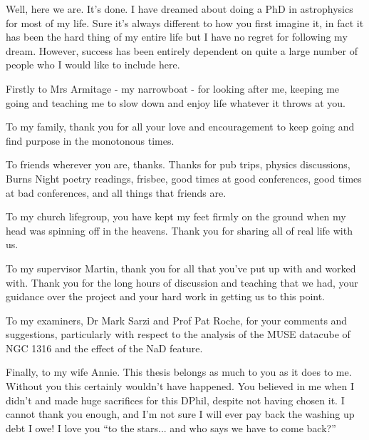 \begin{acknowledgementslong}
Well, here we are. It's done. I have dreamed about doing a PhD in astrophysics for most of my life. Sure it's always different to how you first imagine it, in fact it has been the hard thing of my entire life but I have no regret for following my dream. However, success has been entirely dependent on quite a large number of people who I would like to include here. 

Firstly to Mrs Armitage - my narrowboat - for looking after me, keeping me going and teaching me to slow down and enjoy life whatever it throws at you. 

To my family, thank you for all your love and encouragement to keep going and find purpose in the monotonous times. 

To friends wherever you are, thanks. Thanks for pub trips, physics discussions, Burns Night poetry readings, frisbee, good times at good conferences, good times at bad conferences, and all things that friends are.

To my church lifegroup, you have kept my feet firmly on the ground when my head was spinning off in the heavens. Thank you for sharing all of real life with us. 

To my supervisor Martin, thank you for all that you've put up with and worked with. Thank you for the long hours of discussion and teaching that we had, your guidance over the project and your hard work in getting us to this point. 

To my examiners, Dr Mark Sarzi and Prof Pat Roche, for your comments and suggestions, particularly with respect to the analysis of the MUSE datacube of NGC 1316 and the effect of the NaD feature. 

Finally, to my wife Annie. This thesis belongs as much to you as it does to me. Without you this certainly wouldn't have happened. You believed in me when I didn't and made huge sacrifices for this DPhil, despite not having chosen it. I cannot thank you enough, and I'm not sure I will ever pay back the washing up debt I owe! I love you ``to the stars... and who says we have to come back?''
\end{acknowledgementslong}